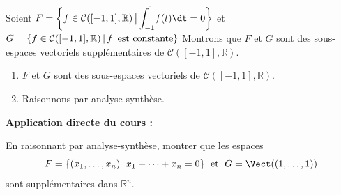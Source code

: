 \documentclass[french,11pt,twoside]{VcCours}
\newenvironment{ApplicationDirecte}{\textbf{Application directe du cours :}

}{}
\newcommand{\dx}{\text{d}x}
\newcommand{\Int}[2]{\ensuremath{\mathchoice%
	{{\displaystyle\int_{#1}^{#2}}}
	{{\displaystyle\int_{#1}^{#2}}}
	{\int_{#1}^{#2}}
	{\int_{#1}^{#2}}
}}
\begin{document}
\begin{Exemple} Soient $F = \left\lbrace f \in \mathcal{C}([-1,1], \mathbb{R}) \, \big{\vert} \, \Int{ - 1}{1} f(t) \dt = 0\right\rbrace$ et $G = \left\lbrace  f \in \mathcal{C}([-1,1], \mathbb{R})\, \vert \, f \, \hbox{ est constante} \right\rbrace$
Montrons que $F$ et $G$ sont des sous-espaces vectoriels supplémentaires de $\mathcal{C}([-1,1], \mathbb{R})$.
\begin{enumerate}
\item $F$ et $G$ sont des sous-espaces vectoriels de $\mathcal{C}([-1,1], \mathbb{R})$.
\item Raisonnons par analyse-synthèse.
%
%
%
%
%
\end{enumerate}
\vspace{17cm}
\end{Exemple}
%

\begin{ApplicationDirecte}\label{Exo}  En raisonnant par analyse-synthèse, montrer que les espaces 
$$ F = \lbrace (x_1, \ldots, x_n) \, \vert \, x_1 + \cdots + x_n = 0 \rbrace \; \hbox{ et } \; G= \Vect((1, \ldots, 1)) $$
sont supplémentaires dans $\mathbb{R}^n$.
\end{ApplicationDirecte}
\end{document}
